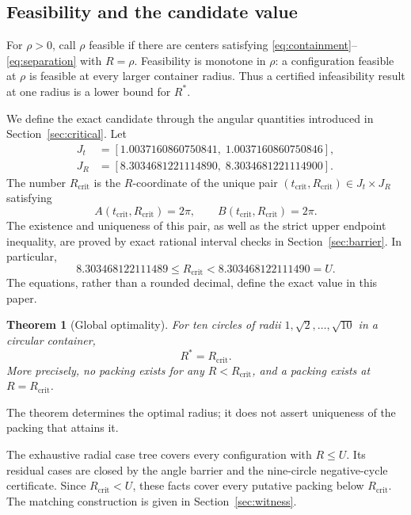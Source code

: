 \documentclass[11pt,a4paper]{article}
\newtheorem{theorem}{Theorem}[section]
\theoremstyle{remark}
\newcommand{\Ropt}{R^*}
\newcommand{\Rcrit}{R_{\mathrm{crit}}}
\newcommand{\Rcap}{U}
\begin{document}
\subsection{Feasibility and the candidate value}

For $\rho>0$, call $\rho$ feasible if there are centers satisfying
\eqref{eq:containment}--\eqref{eq:separation} with $R=\rho$.  Feasibility is
monotone in $\rho$: a configuration feasible at $\rho$ is feasible at every
larger container radius.  Thus a certified infeasibility result at one radius
is a lower bound for $\Ropt$.

We define the exact candidate through the angular quantities introduced in
Section~\ref{sec:critical}.  Let
\[
\begin{aligned}
  J_t&=[1.0037160860750841,\;1.0037160860750846],\\
  J_R&=[8.3034681221114890,\;8.3034681221114900].
\end{aligned}
\]
The number $\Rcrit$ is the $R$-coordinate of the unique pair
$(t_{\mathrm{crit}},R_{\mathrm{crit}})\in J_t\times J_R$ satisfying
\begin{equation}
  A(t_{\mathrm{crit}},R_{\mathrm{crit}})=2\pi,
  \qquad
  B(t_{\mathrm{crit}},R_{\mathrm{crit}})=2\pi.
  \label{eq:root-definition}
\end{equation}
The existence and uniqueness of this pair, as well as the strict upper
endpoint inequality, are proved by exact rational interval checks in
Section~\ref{sec:barrier}.  In particular,
\begin{equation}
  8.303468122111489\le \Rcrit
  < 8.303468122111490 = \Rcap.
  \label{eq:root-bracket}
\end{equation}
The equations, rather than a rounded decimal, define the exact value in this
paper.

\begin{theorem}[Global optimality]
\label{thm:global}
For ten circles of radii $1,\sqrt2,\ldots,\sqrt{10}$ in a circular
container,
\[
  \boxed{\Ropt=\Rcrit}.
\]
More precisely, no packing exists for any $R<\Rcrit$, and a packing exists
at $R=\Rcrit$.
\end{theorem}
The theorem determines the optimal radius; it does not assert uniqueness of the
packing that attains it.

The exhaustive radial case tree covers every configuration with
$R\le\Rcap$.  Its residual cases are closed by the angle barrier and the
nine-circle negative-cycle certificate.  Since $\Rcrit<\Rcap$, these facts
cover every putative packing below $\Rcrit$.  The matching construction is
given in Section~\ref{sec:witness}.
\end{document}
